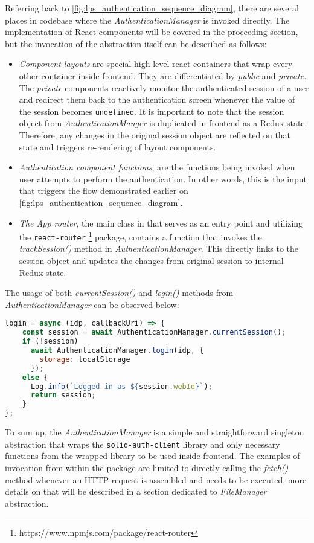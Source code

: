 Referring back to \autoref{fig:lps_authentication_sequence_diagram}, there are several places in \lpa{} codebase where the \textit{AuthenticationManager} is invoked directly. The implementation of React components will be covered in the proceeding section, but the invocation of the abstraction itself can be described as follows:
\begin{itemize}
    \item \textit{Component layouts} are special high-level react containers that wrap every other container inside \lpa{} frontend. They are differentiated by \textit{public} and \textit{private}. The \textit{private} components reactively monitor the authenticated session of a user and redirect them back to the authentication screen whenever the value of the session becomes \texttt{undefined}. It is important to note that the session object from \textit{AuthenticationManger} is duplicated in \lpa{} frontend as a Redux state. Therefore, any changes in the original session object are reflected on that state and triggers re-rendering of layout components. 
    \item \textit{Authentication component functions}, are the functions being invoked when user attempts to perform the authentication. In other words, this is the input that triggers the flow demonstrated earlier on \autoref{fig:lps_authentication_sequence_diagram}.
    \item \textit{The App router}, the main class in \lpa{} that serves as an entry point and utilizing the \texttt{react-router} \footnote{https://www.npmjs.com/package/react-router} package, contains a function that invokes the \textit{trackSession()} method in \textit{AuthenticationManager}. This directly links to the session object and updates the changes from original session to internal Redux state.
\end{itemize}

The usage of both \textit{currentSession()} and \textit{login()} methods from \textit{AuthenticationManager} can be observed below:
\begin{lstlisting}[language=JavaScript]
login = async (idp, callbackUri) => {
    const session = await AuthenticationManager.currentSession();
    if (!session)
      await AuthenticationManager.login(idp, {
        storage: localStorage
      });
    else {
      Log.info(`Logged in as ${session.webId}`);
      return session;
    }
};
\end{lstlisting}

To sum up, the \textit{AuthenticationManager} is a simple and straightforward singleton abstraction that wraps the \texttt{solid-auth-client} library and only necessary functions from the wrapped library to be used inside \lpas{} frontend. The examples of invocation from within the \lpas{} package are limited to directly calling the \textit{fetch()} method whenever an HTTP request is assembled and needs to be executed, more details on that will be described in a section dedicated to \textit{FileManager} abstraction.  

